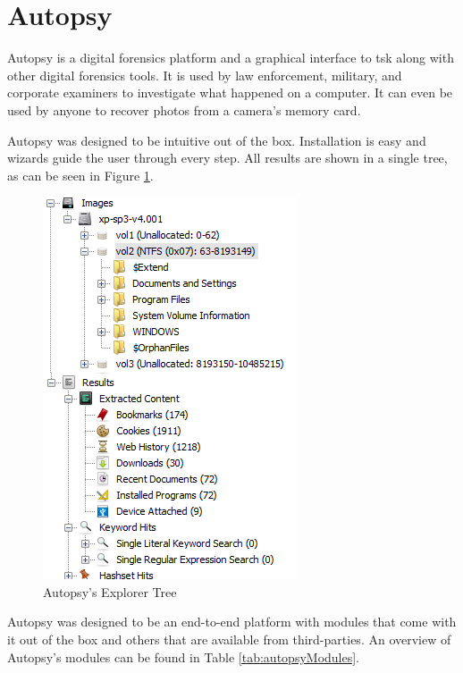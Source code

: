 \section{Autopsy}

Autopsy \cite{autopsy} is a digital forensics platform and a graphical interface to \acrshort{tsk}
along with other digital forensics tools. It is used by law enforcement, military, 
and corporate examiners to investigate what happened on a computer. It can even 
be used by anyone to recover photos from a camera's memory card.

Autopsy was designed to be intuitive out of the box. Installation is easy and
wizards guide the user through every step. All results are shown in a single tree, as can be seen in Figure \ref{fig:tree}.

\begin{figure}[ht]
 \centering
 \includegraphics[width=0.5\linewidth]{imgs/tree.png}
 \caption{Autopsy's Explorer Tree}
 \label{fig:tree}
\end{figure}

Autopsy was designed to be an end-to-end platform with modules that come with
it out of the box and others that are available from third-parties. An overview of Autopsy's modules can be found in Table \ref{tab:autopsyModules}.


